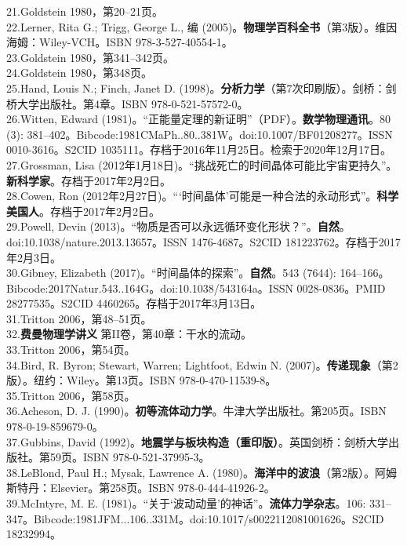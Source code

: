 21.Goldstein 1980，第20–21页。\\
22.Lerner, Rita G.; Trigg, George L., 编 (2005)。\textbf{物理学百科全书}（第3版）。维因海姆：Wiley-VCH。ISBN 978-3-527-40554-1。\\
23.Goldstein 1980，第341–342页。\\
24.Goldstein 1980，第348页。\\
25.Hand, Louis N.; Finch, Janet D. (1998)。\textbf{分析力学}（第7次印刷版）。剑桥：剑桥大学出版社。第4章。ISBN 978-0-521-57572-0。\\
26.Witten, Edward (1981)。“正能量定理的新证明”（PDF）。\textbf{数学物理通讯}。80 (3): 381–402。Bibcode:1981CMaPh..80..381W。doi:10.1007/BF01208277。ISSN 0010-3616。S2CID 1035111。存档于2016年11月25日。检索于2020年12月17日。\\
27.Grossman, Lisa (2012年1月18日)。“挑战死亡的时间晶体可能比宇宙更持久”。\textbf{新科学家}。存档于2017年2月2日。\\
28.Cowen, Ron (2012年2月27日)。“‘时间晶体’可能是一种合法的永动形式”。\textbf{科学美国人}。存档于2017年2月2日。\\
29.Powell, Devin (2013)。“物质是否可以永远循环变化形状？”。\textbf{自然}。doi:10.1038/nature.2013.13657。ISSN 1476-4687。S2CID 181223762。存档于2017年2月3日。\\
30.Gibney, Elizabeth (2017)。“时间晶体的探索”。\textbf{自然}。543 (7644): 164–166。Bibcode:2017Natur.543..164G。doi:10.1038/543164a。ISSN 0028-0836。PMID 28277535。S2CID 4460265。存档于2017年3月13日。\\
31.Tritton 2006，第48–51页。\\
32.\textbf{费曼物理学讲义} 第II卷，第40章：干水的流动。\\
33.Tritton 2006，第54页。\\
34.Bird, R. Byron; Stewart, Warren; Lightfoot, Edwin N. (2007)。\textbf{传递现象}（第2版）。纽约：Wiley。第13页。ISBN 978-0-470-11539-8。\\
35.Tritton 2006，第58页。\\
36.Acheson, D. J. (1990)。\textbf{初等流体动力学}。牛津大学出版社。第205页。ISBN 978-0-19-859679-0。\\
37.Gubbins, David (1992)。\textbf{地震学与板块构造（重印版）}。英国剑桥：剑桥大学出版社。第59页。ISBN 978-0-521-37995-3。\\
38.LeBlond, Paul H.; Mysak, Lawrence A. (1980)。\textbf{海洋中的波浪}（第2版）。阿姆斯特丹：Elsevier。第258页。ISBN 978-0-444-41926-2。\\
39.McIntyre, M. E. (1981)。“关于‘波动动量’的神话”。\textbf{流体力学杂志}。106: 331–347。Bibcode:1981JFM...106..331M。doi:10.1017/s0022112081001626。S2CID 18232994。\\
